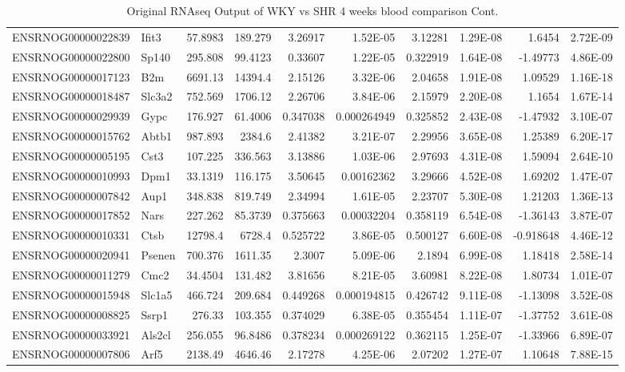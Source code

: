 \begin{sidewaystable}[]
\begin{tabular}{llrrrrrrrr}
ENSRNOG00000022839 & Ifit3    & 57.8983      & 189.279      & 3.26917  & 1.52E-05    & 3.12281     & 1.29E-08    & 1.6454       & 2.72E-09    \\
ENSRNOG00000022800 & Sp140    & 295.808      & 99.4123      & 0.33607  & 1.22E-05    & 0.322919    & 1.64E-08    & -1.49773     & 4.86E-09    \\
ENSRNOG00000017123 & B2m      & 6691.13      & 14394.4      & 2.15126  & 3.32E-06    & 2.04658     & 1.91E-08    & 1.09529      & 1.16E-18    \\
ENSRNOG00000018487 & Slc3a2   & 752.569      & 1706.12      & 2.26706  & 3.84E-06    & 2.15979     & 2.20E-08    & 1.1654       & 1.67E-14    \\
ENSRNOG00000029939 & Gypc     & 176.927      & 61.4006      & 0.347038 & 0.000264949 & 0.325852    & 2.43E-08    & -1.47932     & 3.10E-07    \\
ENSRNOG00000015762 & Abtb1    & 987.893      & 2384.6       & 2.41382  & 3.21E-07    & 2.29956     & 3.65E-08    & 1.25389      & 6.20E-17    \\
ENSRNOG00000005195 & Cst3     & 107.225      & 336.563      & 3.13886  & 1.03E-06    & 2.97693     & 4.31E-08    & 1.59094      & 2.64E-10    \\
ENSRNOG00000010993 & Dpm1     & 33.1319      & 116.175      & 3.50645  & 0.00162362  & 3.29666     & 4.52E-08    & 1.69202      & 1.47E-07    \\
ENSRNOG00000007842 & Aup1     & 348.838      & 819.749      & 2.34994  & 1.61E-05    & 2.23707     & 5.30E-08    & 1.21203      & 1.36E-13    \\
ENSRNOG00000017852 & Nars     & 227.262      & 85.3739      & 0.375663 & 0.00032204  & 0.358119    & 6.54E-08    & -1.36143     & 3.87E-07    \\
ENSRNOG00000010331 & Ctsb     & 12798.4      & 6728.4       & 0.525722 & 3.86E-05    & 0.500127    & 6.60E-08    & -0.918648    & 4.46E-12    \\
ENSRNOG00000020941 & Psenen   & 700.376      & 1611.35      & 2.3007   & 5.09E-06    & 2.1894      & 6.99E-08    & 1.18418      & 2.58E-14    \\
ENSRNOG00000011279 & Cmc2     & 34.4504      & 131.482      & 3.81656  & 8.21E-05    & 3.60981     & 8.22E-08    & 1.80734      & 1.01E-07    \\
ENSRNOG00000015948 & Slc1a5   & 466.724      & 209.684      & 0.449268 & 0.000194815 & 0.426742    & 9.11E-08    & -1.13098     & 3.52E-08    \\
ENSRNOG00000008825 & Ssrp1    & 276.33       & 103.355      & 0.374029 & 6.38E-05    & 0.355454    & 1.11E-07    & -1.37752     & 3.61E-08    \\
ENSRNOG00000033921 & Als2cl   & 256.055      & 96.8486      & 0.378234 & 0.000269122 & 0.362115    & 1.25E-07    & -1.33966     & 6.89E-07    \\
ENSRNOG00000007806 & Arf5     & 2138.49      & 4646.46      & 2.17278  & 4.25E-06    & 2.07202     & 1.27E-07    & 1.10648      & 7.88E-15   
\end{tabular}
\caption{Original RNAseq Output of WKY vs SHR 4 weeks blood comparison Cont.}
\label{fig:all2RNAseq}
\end{sidewaystable}